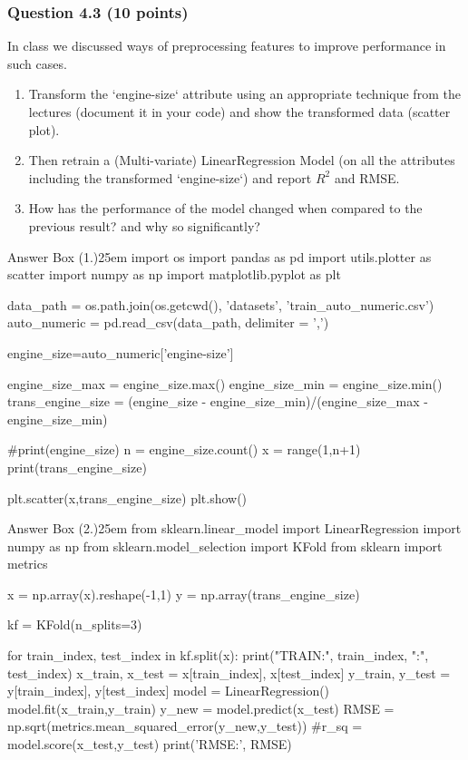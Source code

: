 \documentclass[12pt]{article}
\begin{document}
\subsubsection*{Question 4.3 (10 points)}
In class we discussed ways of preprocessing features to improve performance in such cases.
\begin{enumerate}
    \item [1.] [Code] Transform the `engine-size` attribute using an appropriate technique from the lectures (document it in your code) and show the transformed data (scatter plot).
    \item [2.] [Code] Then retrain a (Multi-variate) LinearRegression Model (on all the attributes including the transformed `engine-size`) and report $R^2$ and RMSE. 
    \item [3.] [Text] How has the performance of the model changed when compared to the previous result? and why so significantly?
\end{enumerate}

\begin{code}{Answer Box (1.)}{25em}
import os
import pandas as pd
import utils.plotter as scatter
import numpy as np
import matplotlib.pyplot as plt

data_path = os.path.join(os.getcwd(), 'datasets', 'train_auto_numeric.csv')
auto_numeric = pd.read_csv(data_path, delimiter = ',')

engine_size=auto_numeric['engine-size']

engine_size_max = engine_size.max()
engine_size_min = engine_size.min()
trans_engine_size = (engine_size - engine_size_min)/(engine_size_max - engine_size_min)

#print(engine_size)
n = engine_size.count()
x = range(1,n+1)
print(trans_engine_size)

plt.scatter(x,trans_engine_size)
plt.show()

\end{code}


\begin{code}{Answer Box (2.)}{25em}
from sklearn.linear_model import LinearRegression
import numpy as np
from sklearn.model_selection import KFold
from sklearn import metrics

x = np.array(x).reshape(-1,1)
y = np.array(trans_engine_size)

kf = KFold(n_splits=3)

for train_index, test_index in kf.split(x):
    print("TRAIN:", train_index, "\nTEST:", test_index)
    x_train, x_test = x[train_index], x[test_index]
    y_train, y_test = y[train_index], y[test_index]
    model = LinearRegression()
    model.fit(x_train,y_train)
    y_new = model.predict(x_test)
    RMSE = np.sqrt(metrics.mean_squared_error(y_new,y_test))
    #r_sq = model.score(x_test,y_test)
    print('RMSE:', RMSE)
\end{code}
\end{document}
